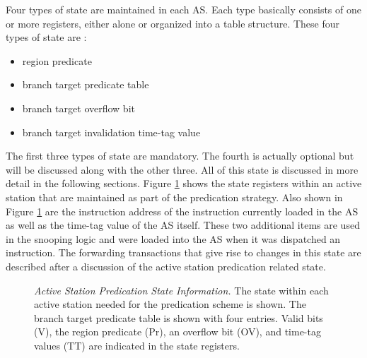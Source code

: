 \documentclass[10pt,dvips]{article}
\begin{document}
Four types of state are maintained in each AS.
Each type basically consists of one or more registers, either
alone or organized into a table structure.
These four types of state are :
%
\begin{itemize}
\item{region predicate}
\item{branch target predicate table}
\item{branch target overflow bit}
\item{branch target invalidation time-tag value}
\end{itemize}   
%
The first three types of state are mandatory.
The fourth is actually optional but will be discussed along
with the other three.
All of this state is discussed in more detail in the following
sections.
Figure \ref{fig:state} shows the state registers within an
active station that are maintained as part of the predication
strategy.  Also shown in Figure \ref{fig:state} are the instruction
address of the instruction currently loaded in the AS as well
as the time-tag value of the AS itself.  These two additional
items are used in the snooping logic and were loaded into the
AS when it was dispatched an instruction.
The forwarding transactions that give rise to changes in this
state are described after a discussion of the active station
predication related state.
%
\begin{figure}
\centering
{}
\caption{{\em Active Station Predication State Information.} 
The state within each active station needed for the predication
scheme is shown.
The branch target predicate table is shown with four entries.
Valid bits (V), the region predicate (Pr), an overflow bit (OV),
and time-tag values (TT)
are indicated in the state registers.}
\label{fig:state}
\end{figure}
%
\end{document}
